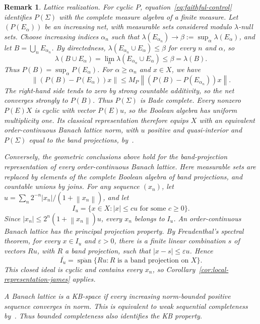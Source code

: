 \documentclass[11pt,leqno]{amsart}
\theoremstyle{compact}
\numberwithin{equation}{section}
\theoremstyle{compactremark}
\newtheorem{remark}[theorem]{Remark}
\theoremstyle{compact}
\def\cspan{\overline{\operatorname{span}}}
\newcommand{\1}{\mathbbm{1}}
\newcommand{\norm}[1]{\left\|#1\right\|}
\newcommand{\abs}[1]{\left|#1\right|}
\begin{document}
\begin{remark}\label{rem:lattice-james}
\emph{Lattice realization.} For cyclic $P$, equation~\eqref{eq:faithful-control} identifies $P(\Sigma)$ with the complete measure algebra of a finite measure. Let $(P(E_\alpha))$ be an increasing net, with measurable sets considered modulo $\lambda$-null sets. Choose increasing indices $\alpha_n$ such that $\lambda(E_{\alpha_n})\to\beta:=\sup_\alpha\lambda(E_\alpha)$, and let $B=\bigcup_nE_{\alpha_n}$. By directedness, $\lambda(E_{\alpha_n}\cup E_\alpha)\leq\beta$ for every $n$ and $\alpha$, so
\[
\lambda(B\cup E_\alpha)=\lim_n\lambda(E_{\alpha_n}\cup E_\alpha)\leq\beta=\lambda(B).
\]
Thus $P(B)=\sup_\alpha P(E_\alpha)$. For $\alpha\geq\alpha_n$ and $x\in X$, we have
\[
\norm{(P(B)-P(E_\alpha))x}\leq M_P\norm{(P(B)-P(E_{\alpha_n}))x}.
\]
The right-hand side tends to zero by strong countable additivity, so the net converges strongly to $P(B)$. Thus $P(\Sigma)$ is Bade complete. Every nonzero $P(E)X$ is cyclic with vector $P(E)u$, so the Boolean algebra has uniform multiplicity one. Its classical representation therefore equips $X$ with an equivalent order-continuous Banach lattice norm, with $u$ positive and quasi-interior and $P(\Sigma)$ equal to the band projections, by~\cite[Proposition~2.4 and Lemma~2.9]{KitoverOrhon2018}.

Conversely, the geometric conclusions above hold for the band-projection representation of every order-continuous Banach lattice. Here measurable sets are replaced by elements of the complete Boolean algebra of band projections, and countable unions by joins. For any sequence $(x_n)$, let $u=\sum_n2^{-n}\abs{x_n}/(1+\norm{x_n})$, and let
\[
I_u=\{x\in X:\abs{x}\leq cu\text{ for some }c\geq0\}.
\]
Since $\abs{x_n}\leq2^n(1+\norm{x_n})u$, every $x_n$ belongs to $I_u$. An order-continuous Banach lattice has the principal projection property. By Freudenthal's spectral theorem, for every $x\in I_u$ and $\varepsilon>0$, there is a finite linear combination $s$ of vectors $Ru$, with $R$ a band projection, such that $\abs{x-s}\leq\varepsilon u$. Hence
\[
\overline{I_u}=\cspan\{Ru:R\text{ is a band projection on }X\}.
\]
This closed ideal is cyclic and contains every $x_n$, so Corollary~\ref{cor:local-representation-james} applies.

A Banach lattice is a \emph{KB-space} if every increasing norm-bounded positive sequence converges in norm. This is equivalent to weak sequential completeness by~\cite[Theorem~2.18 and the proof of Lemma~2.19]{KitoverOrhon2017}. Thus bounded completeness also identifies the KB property.


\end{remark}
\end{document}
